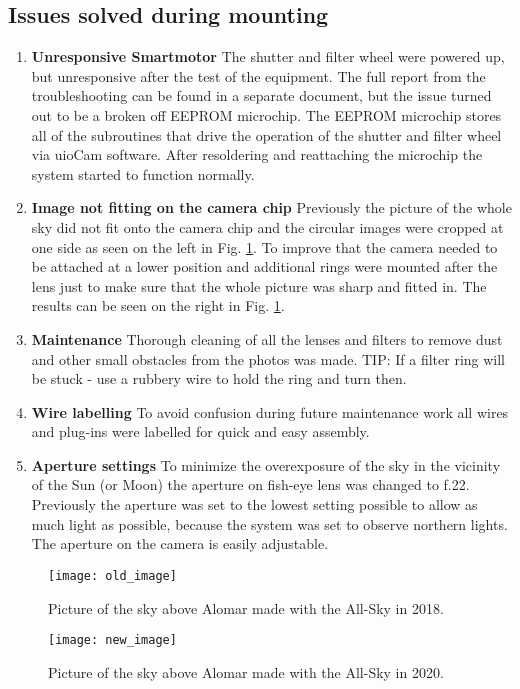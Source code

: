\documentclass[]{book}
\begin{document}
	\subsection{Issues solved during mounting}
	\begin{enumerate}
		\item \textbf{Unresponsive Smartmotor} The shutter and filter wheel were powered up, but unresponsive after the test of the equipment. The full report from the troubleshooting can be found in a separate document, but the issue turned out to be a broken off EEPROM microchip. The EEPROM microchip stores all of the subroutines that drive the operation of the shutter and filter wheel via uioCam software. After resoldering and reattaching the microchip the system started to function normally.
		\item \textbf{Image not fitting on the camera chip} Previously the picture of the whole sky did not fit onto the camera chip and the circular images were cropped at one side as seen on the left in Fig. \ref{fig: comparison_images}. To improve that the camera needed to be attached at a lower position and additional rings were mounted after the lens just to make sure that the whole picture was sharp and fitted in. The results can be seen on the right in Fig. \ref{fig: comparison_images}.
		\item \textbf{Maintenance} Thorough cleaning of all the lenses and filters to remove dust and other small obstacles from the photos was made.
		TIP: If a filter ring will be stuck - use a rubbery wire to hold the ring and turn then.
		\item \textbf{Wire labelling} To avoid confusion during future maintenance work all wires and plug-ins were labelled for quick and easy assembly.
		\item \textbf{Aperture settings} To minimize the overexposure of the sky in the vicinity of the Sun (or Moon) the aperture on fish-eye lens was changed to f.22. Previously the aperture was set to the lowest setting possible to allow as much light as possible, because the system was set to observe northern lights. The aperture on the camera is easily adjustable.
	\end{enumerate}

		\begin{figure} [h]
		\centering
		\label{fig: comparison_images}
		\begin{minipage}{0.45\textwidth}
			\centering
			\texttt{[image: old\_image]}
			\caption{Picture of the sky above Alomar made with the All-Sky in 2018.}
		\end{minipage}\hfill
		\begin{minipage}{0.45\textwidth}
			\centering
			\texttt{[image: new\_image]}
			\caption{Picture of the sky above Alomar made with the All-Sky in 2020.}
		\end{minipage}
	\end{figure}
\end{document}
